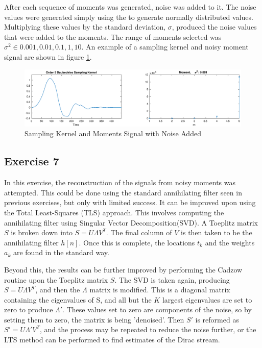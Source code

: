 \documentclass[a4paper]{article}
\begin{document}
After each sequence of moments was generated, noise was added to it. The noise values were generated simply using the  to generate normally distributed values. Multiplying these values by the standard deviation, $\sigma$, produced the noise values that were added to the moments. The range of moments selected was $\sigma^2 \in {0.001, 0.01, 0.1, 1, 10}$. An example of a sampling kernel and noisy moment signal are shown in figure \ref{fig:ex6_1}.


\begin{figure}[H]
    \centering
    \includegraphics[width=\textwidth]{../images/ex6}
    \caption{Sampling Kernel and Moments Signal with Noise Added}
    \label{fig:ex6_1}
\end{figure}


\subsection{Exercise 7}

In this exercise, the reconstruction of the signals from noisy moments was attempted. This could be done using the standard annihilating filter seen in previous exercises, but only with limited success. It can be improved upon using the Total Least-Squares (TLS) approach. This involves computing the annihilating filter using Singular Vector Decomposition(SVD). A Toeplitz matrix $S$ is broken down into $S = U\Lambda V^T$. The final column of $V$ is then taken to be the annihilating filter $h[n]$. Once this is complete, the locations $t_k$ and the weights $a_k$ are found in the standard way.

Beyond this, the results can be further improved by performing the Cadzow routine upon the Toeplitz matrix $S$. The SVD is taken again, producing $S = U\Lambda V^T$, and then the $\Lambda$ matrix is modified. This is a diagonal matrix containing the eigenvalues of S, and all but the $K$ largest eigenvalues are set to zero to produce $\Lambda'$. These values set to zero are components of the noise, so by setting them to zero, the matrix is being 'denoised'. Then $S'$ is reformed as $S' = U\Lambda'V^T$, and the process may be repeated to reduce the noise further, or the LTS method can be performed to find estimates of the Dirac stream.
\end{document}
